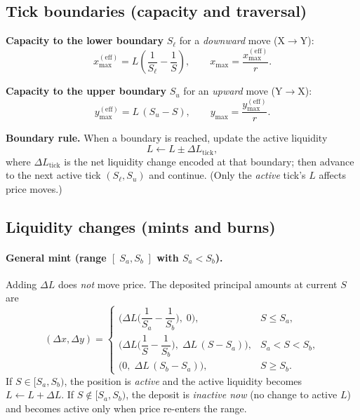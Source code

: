 \documentclass[a4paper,11pt]{article}
\begin{document}
\subsection{Tick boundaries (capacity and traversal)}
\label{app:boundaries}
\textbf{Capacity to the lower boundary} \(S_\ell\) for a \emph{downward} move (X\(\to\)Y):
\begin{equation}
x_{\max}^{(\mathrm{eff})}=L\!\left(\frac{1}{S_\ell}-\frac{1}{S}\right),\qquad
x_{\max}= \frac{x_{\max}^{(\mathrm{eff})}}{r}.
\end{equation}

\noindent
\textbf{Capacity to the upper boundary} \(S_u\) for an \emph{upward} move (Y\(\to\)X):
\begin{equation}
y_{\max}^{(\mathrm{eff})}=L\,(S_u-S),\qquad
y_{\max}=\frac{y_{\max}^{(\mathrm{eff})}}{r}.
\end{equation}

\noindent
\textbf{Boundary rule.}
When a boundary is reached, update the active liquidity
\begin{equation}
L \leftarrow L \pm \Delta L_{\mathrm{tick}},
\end{equation}
where \(\Delta L_{\mathrm{tick}}\) is the net liquidity change encoded at that boundary; then advance to the next active tick \((S_\ell,S_u)\) and continue.
(Only the \emph{active} tick’s \(L\) affects price moves.)

\subsection{Liquidity changes (mints and burns)}
\label{app:mints-burns}
\paragraph{General mint (range \([\;S_a,S_b\;]\) with \(S_a<S_b\)).}
Adding \(\Delta L\) does \emph{not} move price.
The deposited principal amounts at current \(S\) are
\begin{equation}
(\Delta x,\Delta y)=
\begin{cases}
\Big(\Delta L\!\big(\dfrac{1}{S_a}-\dfrac{1}{S_b}\big),\; 0\Big), & S\le S_a,\\[8pt]
\Big(\Delta L\!\big(\dfrac{1}{S}-\dfrac{1}{S_b}\big),\; \Delta L\,(S-S_a)\Big), & S_a<S<S_b,\\[8pt]
\Big(0,\; \Delta L\,(S_b-S_a)\Big), & S\ge S_b.
\end{cases}
\end{equation}
If \(S\in[S_a,S_b)\), the position is \emph{active} and the active liquidity becomes \(L\leftarrow L+\Delta L\).
If \(S\notin[S_a,S_b)\), the deposit is \emph{inactive now} (no change to active \(L\)) and becomes active only when price re-enters the range.
\end{document}
